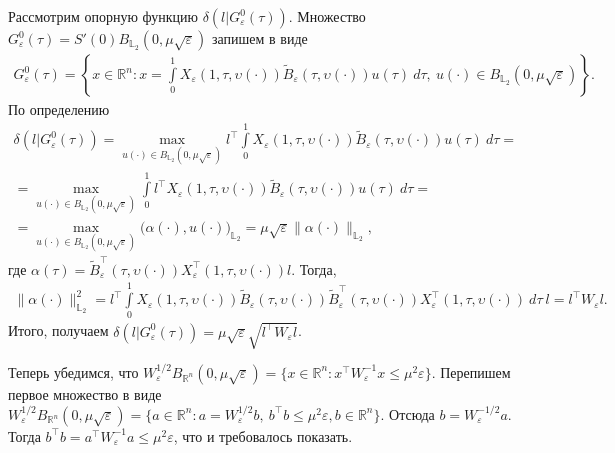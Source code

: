 \documentclass[../main.tex]{subfiles}
\begin{document}
Рассмотрим опорную функцию $\delta(l | G^0_{\varepsilon}(\tau))$. 
Множество $G^0_{\varepsilon}(\tau) = S'(0) B_{\mathbb{L}_2}(0,\mu\sqrt{\varepsilon})$ запишем в виде 
\begin{gather*}
	G^0_{\varepsilon}(\tau) = \left\{ x \in \mathbb{R}^n: x = \int\limits_0^1 X_{\varepsilon}(1, \tau, \upsilon(\cdot)) \widetilde{B}_{\varepsilon}(\tau, \upsilon(\cdot)) u(\tau)\ d\tau, \ u(\cdot) \in B_{\mathbb{L}_2}(0,\mu\sqrt{\varepsilon}) \right\}.
\end{gather*} 
По определению
\begin{gather*}
	\delta(l | G^0_{\varepsilon}(\tau)) = \max\limits_{u(\cdot) \in B_{\mathbb{L}_2}(0,\mu\sqrt{\varepsilon})} l^{\top} \int\limits_0^1 X_{\varepsilon}(1, \tau, \upsilon(\cdot)) \widetilde{B}_{\varepsilon}(\tau, \upsilon(\cdot)) u(\tau)\ d\tau = \\ =
	\max\limits_{u(\cdot) \in B_{\mathbb{L}_2}(0,\mu\sqrt{\varepsilon})} \int\limits_0^1 l^{\top} X_{\varepsilon}(1, \tau, \upsilon(\cdot)) \widetilde{B}_{\varepsilon}(\tau, \upsilon(\cdot)) u(\tau)\ d\tau =\\=
	 \max\limits_{u(\cdot) \in B_{\mathbb{L}_2}(0,\mu\sqrt{\varepsilon})} \Big(\alpha(\cdot), u(\cdot)\Big)_{\mathbb{L}_2} =
	 \mu\sqrt{\varepsilon} \| \alpha(\cdot)\|_{\mathbb{L}_2},
\end{gather*}
где $ \alpha(\tau) = \widetilde{B}^{\top}_{\varepsilon}(\tau, \upsilon(\cdot)) X^{\top}_{\varepsilon}(1, \tau, \upsilon(\cdot)) l$. 
Тогда,
\begin{gather*}
	\| \alpha(\cdot)\|^2_{\mathbb{L}_2} = l^{\top} \int\limits_0^1 X_{\varepsilon}(1, \tau, \upsilon(\cdot)) \widetilde{B}_{\varepsilon}(\tau, \upsilon(\cdot)) \widetilde{B}^{\top}_{\varepsilon}(\tau, \upsilon(\cdot)) X^{\top}_{\varepsilon}(1, \tau, \upsilon(\cdot)) \ d\tau \ l = l^{\top} W_{\varepsilon} l.
\end{gather*}
Итого, получаем $\delta(l | G^0_{\varepsilon}(\tau)) = \mu\sqrt{\varepsilon} \sqrt{l^{\top} W_{\varepsilon} l} $.

Теперь убедимся, что $W^{1/2}_{\varepsilon} B_{\mathbb{R}^n}(0,\mu\sqrt{\varepsilon}) = \{ x \in \mathbb{R}^n: x^{\top} W^{-1}_{\varepsilon} x \leqslant \mu^2 \varepsilon \} $.
Перепишем первое множество в виде $ W^{1/2}_{\varepsilon} B_{\mathbb{R}^n}(0,\mu\sqrt{\varepsilon}) = \{ a \in \mathbb{R}^n: a = W^{1/2}_{\varepsilon} b, \ b^{\top} b \leqslant \mu^2 \varepsilon, b \in \mathbb{R}^n \} $. 
Отсюда $b = W^{-1/2}_{\varepsilon} a $.
Тогда $ b^{\top} b = a^{\top} W^{-1}_{\varepsilon} a \leqslant \mu^2 \varepsilon $, что и требовалось показать.
\end{document}
